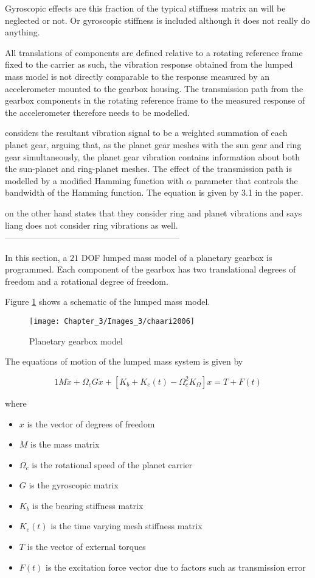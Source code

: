 Gyroscopic effects are this fraction of the typical stiffness matrix an will be neglected or not. Or gyroscopic stiffness is included although it does not really do anything. 

All translations of components are defined relative to a rotating reference frame fixed to the carrier as such, the vibration response obtained from the lumped mass model is not directly comparable to the response measured by an accelerometer mounted to the gearbox housing. The transmission path from the gearbox components in the rotating reference frame to the measured response of the accelerometer therefore needs to be modelled.

\cite{Liang2015} considers the resultant vibration signal to be a weighted summation of each planet gear, arguing that, as the planet gear meshes with the sun gear and ring gear simultaneously, the planet gear vibration contains information about both the sun-planet and ring-planet meshes. The effect of the transmission path is modelled by a modified Hamming function with $\alpha$ parameter that controls the bandwidth of the Hamming function. The equation is given by 3.1 in the paper.

\cite{Parra2017} on the other hand states that they consider ring and planet vibrations and says liang does not consider ring vibrations as well. 
--------------------------------------------------------------


In this section, a $21$ DOF lumped mass model of a planetary gearbox \citep{Chaari2006} is programmed. Each component of the gearbox has two translational degrees of freedom and a rotational degree of freedom.

Figure \ref{F:model} shows a schematic of the lumped mass model. 

\begin{figure}[H]
	\centering
	\texttt{[image: Chapter\_3/Images\_3/chaari2006]}
	\caption{Planetary gearbox model \citep{Chaari2006}}
	\label{F:model}
\end{figure}

The equations of motion of the lumped mass system is given by 

\begin{equation}1
M \ddot{x}+\Omega_{c} G \dot{x}+\left[K_{b}+K_{e}(t)-\Omega_{c}^{2} K_{\Omega}\right] x=T+F(t)
\end{equation}

where 
\begin{itemize}
	\item $x$ is the vector of degrees of freedom
	\item $M$ is the mass matrix
	\item $\Omega_{c}$ is the rotational speed of the planet carrier
	\item $G$ is the gyroscopic matrix 
	\item $K_{b}$ is the bearing stiffness matrix
	\item $K_{e}(t)$ is the time varying mesh stiffness matrix
	\item $T$ is the vector of external torques
	\item $F(t)$ is the excitation force vector due to factors such as transmission error        
\end{itemize}

